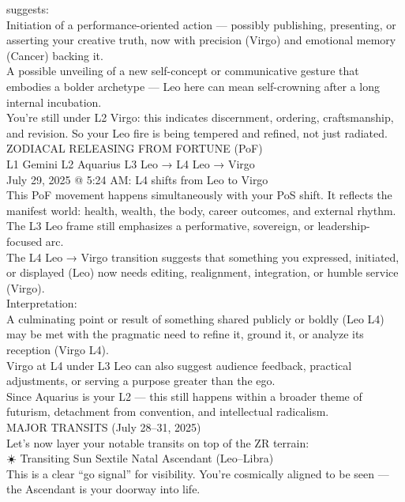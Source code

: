 \documentclass{article}
\begin{document}
suggests:\\
Initiation of a performance-oriented action --- possibly publishing,
presenting, or asserting your creative truth, now with precision (Virgo)
and emotional memory (Cancer) backing it.\\
A possible unveiling of a new self-concept or communicative gesture that
embodies a bolder archetype --- Leo here can mean self-crowning after a
long internal incubation.\\
You're still under L2 Virgo: this indicates discernment, ordering,
craftsmanship, and revision. So your Leo fire is being tempered and
refined, not just radiated.\\
 ZODIACAL RELEASING FROM FORTUNE (PoF)\\
L1 Gemini \textbar{} L2 Aquarius \textbar{} L3 Leo → L4 Leo → Virgo\\
July 29, 2025 @ 5:24 AM: L4 shifts from Leo to Virgo\\
This PoF movement happens simultaneously with your PoS shift. It
reflects the manifest world: health, wealth, the body, career outcomes,
and external rhythm.\\
The L3 Leo frame still emphasizes a performative, sovereign, or
leadership-focused arc.\\
The L4 Leo → Virgo transition suggests that something you expressed,
initiated, or displayed (Leo) now needs editing, realignment,
integration, or humble service (Virgo).\\
Interpretation:\\
A culminating point or result of something shared publicly or boldly
(Leo L4) may be met with the pragmatic need to refine it, ground it, or
analyze its reception (Virgo L4).\\
Virgo at L4 under L3 Leo can also suggest audience feedback, practical
adjustments, or serving a purpose greater than the ego.\\
Since Aquarius is your L2 --- this still happens within a broader theme
of futurism, detachment from convention, and intellectual radicalism.\\
 MAJOR TRANSITS (July 28--31, 2025)\\
Let's now layer your notable transits on top of the ZR terrain:\\
☀️ Transiting Sun Sextile Natal Ascendant (Leo--Libra)\\
This is a clear ``go signal'' for visibility. You're cosmically aligned
to be seen --- the Ascendant is your doorway into life.\\
\end{document}
